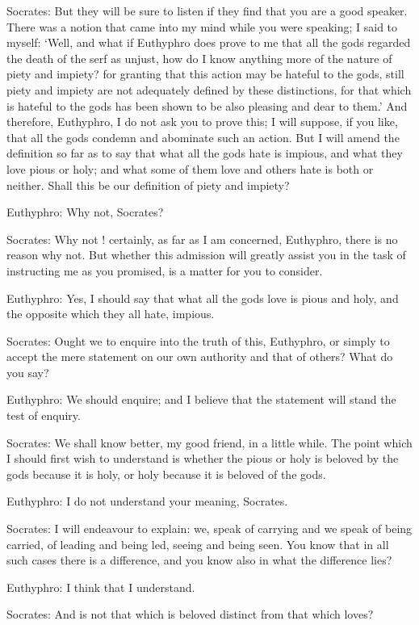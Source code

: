 Socrates: But they will be sure to listen if they find that you are a good speaker. There was a notion that came into my mind while you were speaking; I said to myself: `Well, and what if Euthyphro does prove to me that all the gods regarded the death of the serf as unjust, how do I know anything more of the nature of piety and impiety? for granting that this action may be hateful to the gods, still piety and impiety are not adequately defined by these distinctions, for that which is hateful to the gods has been shown to be also pleasing and dear to them.' And therefore, Euthyphro, I do not ask you to prove this; I will suppose, if you like, that all the gods condemn and abominate such an action. But I will amend the definition so far as to say that what all the gods hate is impious, and what they love pious or holy; and what some of them love and others hate is both or neither. Shall this be our definition of piety and impiety?

Euthyphro: Why not, Socrates?

Socrates: Why not ! certainly, as far as I am concerned, Euthyphro, there is no reason why not. But whether this admission will greatly assist you in the task of instructing me as you promised, is a matter for you to consider.

Euthyphro: Yes, I should say that what all the gods love is pious and holy, and the opposite which they all hate, impious.

Socrates: Ought we to enquire into the truth of this, Euthyphro, or simply to accept the mere statement on our own authority and that of others? What do you say?

Euthyphro: We should enquire; and I believe that the statement will stand the test of enquiry.

Socrates: We shall know better, my good friend, in a little while. The point which I should first wish to understand is whether the pious or holy is beloved by the gods because it is holy, or holy because it is beloved of the gods.

Euthyphro: I do not understand your meaning, Socrates.

Socrates: I will endeavour to explain: we, speak of carrying and we speak of being carried, of leading and being led, seeing and being seen. You know that in all such cases there is a difference, and you know also in what the difference lies?

Euthyphro: I think that I understand.

Socrates: And is not that which is beloved distinct from that which loves?

